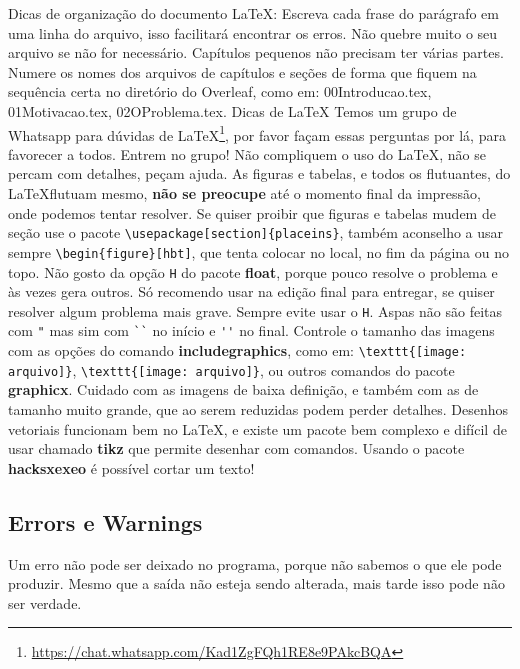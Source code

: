 \documentclass{article}
\begin{document}
\begin{outline}
\1 Dicas de organização do documento \LaTeX:
\2 Escreva cada frase do parágrafo em uma linha do arquivo, isso facilitará encontrar os erros.
\2 Não quebre muito o seu arquivo se não for necessário. Capítulos pequenos não precisam ter várias partes.
\2 Numere os nomes dos arquivos de capítulos e seções de forma que fiquem na sequência certa no diretório do Overleaf, como em: 00Introducao.tex, 01Motivacao.tex, 02OProblema.tex.
\1 Dicas de \LaTeX
\2 Temos um grupo de Whatsapp para dúvidas de \LaTeX\footnote{\url{https://chat.whatsapp.com/Kad1ZgFQh1RE8e9PAkcBQA}}, por favor façam essas perguntas por lá, para favorecer a todos. Entrem no grupo!
\2 Não compliquem o uso do \LaTeX, não se percam com detalhes, peçam ajuda. 
\2 As figuras e tabelas, e todos os flutuantes, do \LaTeX flutuam mesmo, \textbf{não se preocupe} até o momento final da impressão, onde podemos tentar resolver. 
\2 Se quiser proibir que figuras e tabelas mudem de seção use o pacote \verb!\usepackage[section]{placeins}!, também aconselho a usar sempre \verb!\begin{figure}[hbt]!, que tenta colocar no local, no fim da página ou no topo. 
\3 Não gosto da opção \verb!H! do pacote \textbf{float}, porque pouco resolve o problema e às vezes gera outros. Só recomendo usar na edição final para entregar, se quiser resolver algum problema mais grave. Sempre evite usar o \verb!H!.
\2 Aspas não são feitas com \verb!"! mas sim com \verb!``! no início e \verb!''! no final.
\2 Controle o tamanho das imagens com as opções do comando \textbf{includegraphics}, como em: \verb!\texttt{[image: arquivo]}!, \verb!\texttt{[image: arquivo]}!, ou outros comandos do pacote \textbf{graphicx}.
\2 Cuidado com as imagens de baixa definição, e também com as de tamanho muito grande, que ao serem reduzidas podem perder detalhes. 
\2 Desenhos vetoriais funcionam bem no \LaTeX, e existe um pacote bem complexo e difícil de usar chamado \textbf{tikz} que permite desenhar com comandos. 
\2 Usando o pacote \textbf{hacksxexeo} é possível cortar um texto! 
\end{outline}




\subsection{Errors e Warnings}

Um erro não pode ser deixado no programa, porque não sabemos o que ele pode produzir. Mesmo que a saída não esteja sendo alterada, mais tarde isso pode não ser verdade.
\end{document}
